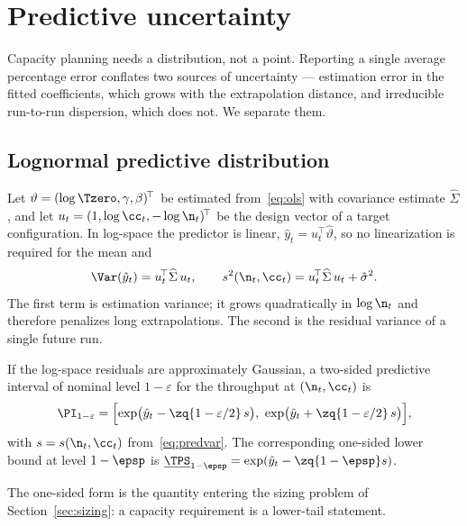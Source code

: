 \section{Predictive uncertainty}
\label{sec:pi}

Capacity planning needs a distribution, not a point. Reporting a single
average percentage error conflates two sources of uncertainty --- estimation
error in the fitted coefficients, which grows with the extrapolation distance,
and irreducible run-to-run dispersion, which does not. We separate them.

\subsection{Lognormal predictive distribution}

Let $\vartheta=(\log\Tzero,\gamma,\beta)^{\!\top}$ be estimated
from~\eqref{eq:ols} with covariance estimate $\widehat{\Sigma}$, and let
$u_{t}=(1,\log\cc_{t},-\log\n_{t})^{\!\top}$ be the design vector of a target
configuration. In log-space the predictor is linear, $\hat y_{t}=u_{t}^{\!\top}
\hat\vartheta$, so no linearization is required for the mean and
\begin{equation}
\Var(\hat y_{t})=u_{t}^{\!\top}\widehat{\Sigma}\,u_{t},
\qquad
s^{2}(\n_{t},\cc_{t})=u_{t}^{\!\top}\widehat{\Sigma}\,u_{t}+\hat\sigma^{2}.
\label{eq:predvar}
\end{equation}
The first term is estimation variance; it grows quadratically in
$\log\n_{t}$ and therefore penalizes long extrapolations. The second is the
residual variance of a single future run.

\begin{State}
\label{st:pi}
If the log-space residuals are approximately Gaussian, a two-sided predictive
interval of nominal level $1-\varepsilon$ for the throughput at
$(\n_{t},\cc_{t})$ is
\begin{equation}
\PI_{1-\varepsilon}
=\Bigl[\exp\bigl(\hat y_{t}-\zq{1-\varepsilon/2}\,s\bigr),\ 
       \exp\bigl(\hat y_{t}+\zq{1-\varepsilon/2}\,s\bigr)\Bigr],
\label{eq:pi}
\end{equation}
with $s=s(\n_{t},\cc_{t})$ from~\eqref{eq:predvar}. The corresponding one-sided
lower bound at level $1-\epsp$ is
$\underline{\TPS}_{1-\epsp}=\exp(\hat y_{t}-\zq{1-\epsp}s)$.
\end{State}

The one-sided form is the quantity entering the sizing problem of
Section~\ref{sec:sizing}: a capacity requirement is a lower-tail statement.

